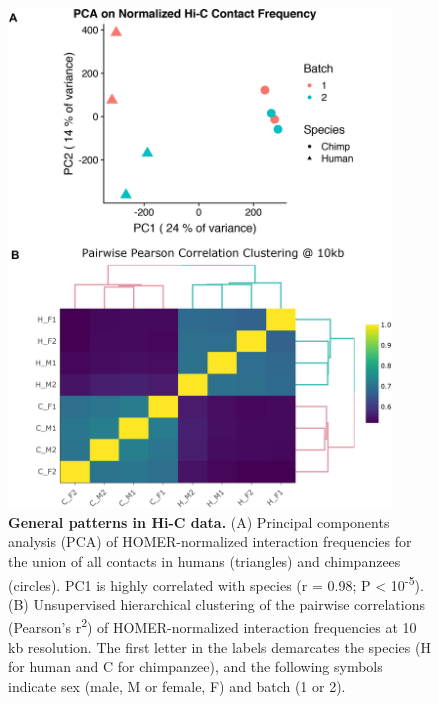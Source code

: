 \begin{figure}
\centering
\includegraphics[width=4in]{img/fig1.PNG}
\caption[General patterns in Hi-C data.]{\textbf{General patterns in Hi-C data.} (A) Principal components analysis (PCA) of HOMER-normalized interaction frequencies for the union of all contacts in humans (triangles) and chimpanzees (circles). PC1 is highly correlated with species (r = 0.98; P {\textless} 10\textsuperscript{-5}). (B) Unsupervised hierarchical clustering of the pairwise correlations (Pearson's r\textsuperscript{2}) of HOMER-normalized interaction frequencies at 10 kb resolution. The first letter in the labels demarcates the species (H for human and C for chimpanzee), and the following symbols indicate sex (male, M or female, F) and batch (1 or 2).}
\label{fig:ch02-fig1}
\end{figure}

